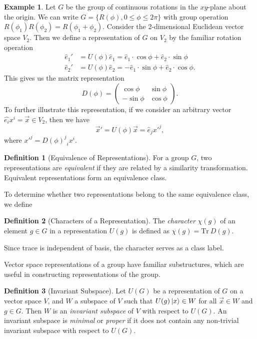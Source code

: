 \documentclass[12pt]{report}
\theoremstyle{definition}
\newtheorem{definition}{Definition}[chapter]
\newtheorem{example}{Example}[chapter]
\begin{document}
\begin{example}
    Let $G$ be the group of continuous rotations in the $xy$-plane about the origin. We can write $G = \{R(\phi),0\leq\phi\leq2\pi\}$ with group operation $R(\phi_1)R(\phi_2) = R(\phi_1+\phi_2)$. Consider the 2-dimensional Euclidean vector space $V_2$. Then we define a representation of $G$ on $V_2$ by the familiar rotation operation
    \begin{align}
        \hat{e}_1' &= U(\phi)\hat{e}_1 = \hat{e}_1\cdot\cos\phi + \hat{e}_2\cdot\sin\phi\\
        \hat{e}_2' &= U(\phi)\hat{e}_2 = -\hat{e}_1\cdot\sin\phi + \hat{e}_2\cdot\cos\phi.
    \end{align}
This gives us the matrix representation
\begin{equation}
    D(\phi) = \begin{pmatrix}
        \cos\phi & \sin\phi\\
        -\sin\phi & \cos\phi
    \end{pmatrix}.
\end{equation}
To further illustrate this representation, if we consider an arbitrary vector $\hat{e_i}x^i=\vec{x}\in V_2$, then we have
\begin{equation}
    \vec{x}' = U(\phi)\vec{x} = \hat{e}_j{x'}^j,
\end{equation}
where ${x'}^j = {{D(\phi)}^j}_i x^i$.
\end{example}

\begin{definition}[Equivalence of Representations]
    For a group $G$, two representations are \textit{equivalent} if they are related by a similarity transformation. Equivalent representations form an equivalence class.
\end{definition}

To determine whether two representations belong to the same equivalence class, we define
\begin{definition}[Characters of a Representation]
    The \textit{character} $\chi(g)$ of an element $g\in G$ in a representation $U(g)$ is defined as $\chi(g) = \text{Tr}~D(g)$.
\end{definition}
Since trace is independent of basis, the character serves as a class label.

Vector space representations of a group have familiar substructures, which are useful in constructing representations of the group.
\begin{definition}[Invariant Subspace]
    Let $U(G)$ be a representation of $G$ on a vector space $V$, and $W$ a subspace of $V$ such that $U(g)\ket{x}\in W$ for all $\vec{x}\in W$ and $g\in G$. Then $W$ is an \textit{invariant subspace} of $V$ with respect to $U(G)$. An invariant subspace is \textit{minimal} or \textit{proper} if it does not contain any non-trivial invariant subspace with respect to $U(G)$.
\end{definition}
\end{document}
